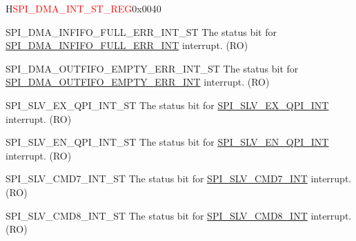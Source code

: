 \begin{register}{H}{\textcolor{red}{SPI\_DMA\_INT\_ST\_REG}}{0x{}0040}\label{regdesc:SPIDMAINTSTREG}
%
%
%
%
%
%
%
%
%
%
%
%
%
%
%
%
%
%
%
%
%
%
\regnewline%
\begin{regdesc}\begin{reglist}
\label{fielddesc:SPIDMAINFIFOFULLERRINTST}\item [SPI\_DMA\_INFIFO\_FULL\_ERR\_INT\_ST] The status bit for \hyperref[int:SPIINFIFOFULLERRINT]{SPI\_DMA\_INFIFO\_FULL\_ERR\_INT} interrupt. (RO)
\label{fielddesc:SPIDMAOUTFIFOEMPTYERRINTST}\item [SPI\_DMA\_OUTFIFO\_EMPTY\_ERR\_INT\_ST] The status bit for \hyperref[int:SPIOUTFIFOEMPTYERRINT]{SPI\_DMA\_OUTFIFO\_EMPTY\_ERR\_INT} interrupt. (RO)
\label{fielddesc:SPISLVEXQPIINTST}\item [SPI\_SLV\_EX\_QPI\_INT\_ST] The status bit for \hyperref[int:SPISLVEXQPIINT]{SPI\_SLV\_EX\_QPI\_INT} interrupt. (RO)
\label{fielddesc:SPISLVENQPIINTST}\item [SPI\_SLV\_EN\_QPI\_INT\_ST] The status bit for \hyperref[int:SPISLVENQPIINT]{SPI\_SLV\_EN\_QPI\_INT} interrupt. (RO)
\label{fielddesc:SPISLVCMD7INTST}\item [SPI\_SLV\_CMD7\_INT\_ST] The status bit for \hyperref[int:SPISLVCMD7INT]{SPI\_SLV\_CMD7\_INT} interrupt. (RO)
\label{fielddesc:SPISLVCMD8INTST}\item [SPI\_SLV\_CMD8\_INT\_ST] The status bit for \hyperref[int:SPISLVCMD8INT]{SPI\_SLV\_CMD8\_INT} interrupt. (RO)

\end{reglist}
\end{regdesc}
\end{register}
